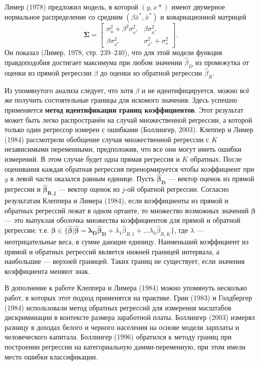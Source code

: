 Лимер (1978) предложил модель, в которой $(y, x*)$ имеют двумерное нормальное распределение со средним $(\beta \bar{x}^*, \bar{x}^*)$ и ковариационной матрицей 
\begin{equation}
\mathbf{\Sigma}=
\begin{bmatrix}
\sigma^2_u+\beta^2\sigma^2_{x^*} & \beta\sigma^2_{x^*} \\ \beta\sigma^2_{x^*} & \sigma^2_{x^*}+\sigma^2_v
\end{bmatrix} .
\end{equation}
Он показал (Лимер, 1978, стр. 239--240), что для этой модели функция правдоподобия достигает максимума при любом значении $\widehat{\beta}_D$ из промежутка от оценки из прямой регрессии $\beta$ до оценки из обратной регрессии $\widehat{\beta}_R$.

Из упомянутого анализа следует, что хотя $\beta$ и не идентифицируется, можно всё же получить состоятельные границы для искомого значения. Здесь успешно применяется {\bf метод идентификации границ коэффициентов}. Этот результат может быть легко распространён на случай множественной регрессии, а которой только один регрессор измерен с ошибками (Боллингер, 2003). Клеппер и Лимер (1984) рассмотрели обобщение случая множественной регрессии с $K$ независимыми переменными, предположив, что все они могут иметь ошибки измерений. В этом случае будет одна прямая регрессия и $K$ обратных. После оценивания каждая обратная регрессия перенормируется чтобы коэффициент при $y$ в левой части оказался равным единице. Пусть $\mathbf{\widehat{\beta}_{D}}$ --- вектор оценок из прямой регрессии и $\mathbf{\widehat{\beta}_{R,j}}$ --- вектор оценок из $j$-ой обратной регрессии. Согласно результатам Клеппера и Лимера (1984), если коэффициенты из прямой и обратных регрессий лежат в одном ортанте, то множество возможных значений $\mathbf{\beta}$ --- это выпуклая оболочка множества коэффициентов для прямой и обратной регрессии; т.е. $\mathbf{\beta} \in \{ \mathbf{\widehat{\beta}|\widehat{\beta}=\lambda_D \widehat{\beta}_D}+\lambda_1 \widehat{\beta}_{R,1}+ \dots \lambda_k \widehat{\beta}_{R,K} \}$, где $\lambda$ --- неотрицательные веса, в сумме дающие единицу. Наименьший коэффициент из прямой и обратных регрессий является нижней границей интервала, а наибольшие --- верхней границей. Таких границ не существует, если значения коэффициента меняют знак.

В дополнение к работе Клеппера и Лимера (1984) можно упомянуть несколько работ, в которых этот подход применятся на практике. Грин (1983) и Голдбергер (1984) использовали метод обратных регрессий для измерения масштабов дискриминации в контексте размера заработной платы. Боллингер (2003) измерял разницу в доходах белого и черного населения на основе модели зарплаты и человеческого капитала. Боллингер (1996) обратился к методу границ при построении  регрессии на категориальную дамми-переменную, при этом имели место ошибки классификации.

